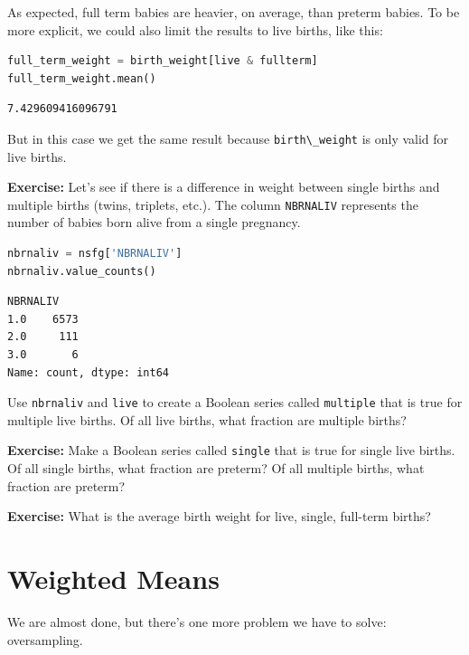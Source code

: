 As expected, full term babies are heavier, on average, than preterm
babies. To be more explicit, we could also limit the results to live
births, like this:

\begin{lstlisting}[language=Python,style=source]
full_term_weight = birth_weight[live & fullterm]
full_term_weight.mean()
\end{lstlisting}

\begin{lstlisting}[style=output]
7.429609416096791
\end{lstlisting}

But in this case we get the same result because
\passthrough{\lstinline!birth\_weight!} is only valid for live births.

\textbf{Exercise:} Let's see if there is a difference in weight between
single births and multiple births (twins, triplets, etc.). The column
\passthrough{\lstinline!NBRNALIV!} represents the number of babies born
alive from a single pregnancy.

\begin{lstlisting}[language=Python,style=source]
nbrnaliv = nsfg['NBRNALIV']
nbrnaliv.value_counts()
\end{lstlisting}

\begin{lstlisting}[style=output]
NBRNALIV
1.0    6573
2.0     111
3.0       6
Name: count, dtype: int64
\end{lstlisting}

Use \passthrough{\lstinline!nbrnaliv!} and
\passthrough{\lstinline!live!} to create a Boolean series called
\passthrough{\lstinline!multiple!} that is true for multiple live
births. Of all live births, what fraction are multiple births?

\textbf{Exercise:} Make a Boolean series called
\passthrough{\lstinline!single!} that is true for single live births. Of
all single births, what fraction are preterm? Of all multiple births,
what fraction are preterm?

\textbf{Exercise:} What is the average birth weight for live, single,
full-term births?

\hypertarget{weighted-means}{%
\section{Weighted Means}\label{weighted-means}}

We are almost done, but there's one more problem we have to solve:
oversampling.

